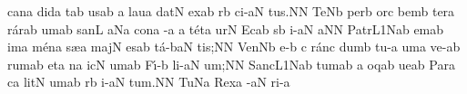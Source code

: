 \spatium
\sgn can\punctum a\egn
\sgn did\punctum a\egn
{}t\pes ab\egn
\sgn {}us\punctum a\augmentum b\egn
\spatium
\divisiominor
\spatium
\custos a
\lineaproxima
\sgn lau\punctum a\egn
\sgn dat\punctum N\egn
\spatium
\sgn {}ex\pes ab\egn
{}r\punctum b\egn
\sgn ci-\clivis aN\egn
\sgn tu{s.}\punctum N\augmentum N\egn
\spatium
\divisiofinalis
\spatium
\sgn Te{}\pes Nb\egn
\spatium
\sgn per\punctum b\egn
\spatium
\sgn {}or\punctum c\egn
\sgn bem\punctum b\egn
\spatium
\sgn ter\punctum a\egn
\sgn r{\'a}r\pes ab\egn
\sgn {}um\punctum a\augmentum b\egn
\spatium
\sgn san\punctum L\egn
{}a{}\pes Na\egn
\spatium
\sgn con\punctum a\egn
{}-\punctum a\egn
\custos a
\lineaproxima
\sgn t{\'e}t\punctum a\egn
\sgn {}ur\punctum N\egn
\spatium
\sgn {}Ec\pes ab\egn
{}s\punctum b\egn
\sgn {}i-\clivis aN\egn
\sgn {}a{}\punctum N\augmentum N\egn
\spatium
\divisiofinalis
\spatium
\sgn Pa{tr}\episem L1\Salicus Nab\egn
\sgn {}em\punctum a\augmentum b\egn
\spatium
\divisiominima
\spatium
\sgn {}im\punctum a\egn
\sgn m{\'e}n\punctum a\egn
\sgn s{\ae}{}\punctum a\egn
\spatium
\sgn maj\punctum N\egn
\sgn {}es\pes ab\egn
\sgn t{\'a}-\climacus baN\egn
\sgn ti{s;}\punctum N\augmentum N\egn
\spatium
\divisiofinalis
\spatium
\sgn Ven\pes Nb\egn
\sgn {}e-\punctum b\egn
\custos c
\lineaproxima
\sgn r{\'a}n\punctum c\egn
\sgn dum\punctum b\egn
\spatium
\sgn tu-\punctum a\egn
\sgn {}um\punctum a\egn
\spatium
\sgn ve-\pes ab\egn
\sgn rum\punctum a\augmentum b\egn
\spatium
\divisiominor
\spatium
\sgn {}et\punctum a\egn
\spatium
{}n\punctum a\egn
\sgn {}ic\punctum N\egn
\sgn {}um\pes ab\egn
\spatium
\sgn F{\'\i}-\punctum b\egn
\sgn li-\clivis aN\egn
\sgn {}u{m;}\punctum N\augmentum N\egn
\spatium
\divisiofinalis
\spatium
\sgn Sa{nc}\episem L1\Salicus Nab\egn
\sgn tu{m}\punctum a\augmentum b\egn
\spatium
\custos a
\lineaproxima
{}oq\pes ab\egn
\sgn ue{}\punctum a\augmentum b\egn
\spatium
\divisiominima
\spatium
\sgn Par\punctum a\egn
{}c\punctum a\egn
\sgn lit\punctum N\egn
\sgn {}um\pes ab\egn
\spatium
{}r\punctum b\egn
\sgn {}i-\clivis aN\egn
\sgn tu{m.}\punctum N\augmentum N\egn
\spatium
\divisiofinalis
\spatium
\sgn Tu{}\pes Na\egn
\spatium
\sgn Rex\punctum a\egn
\spatium
{}-\clivis aN\egn
\sgn ri-\punctum a\egn
